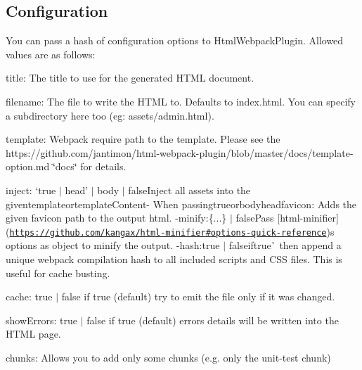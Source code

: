 \subsection*{Configuration }

You can pass a hash of configuration options to {\ttfamily Html\+Webpack\+Plugin}. Allowed values are as follows\+:


\begin{DoxyItemize}
\item {\ttfamily title}\+: The title to use for the generated H\+T\+ML document.
\item {\ttfamily filename}\+: The file to write the H\+T\+ML to. Defaults to {\ttfamily index.\+html}. You can specify a subdirectory here too (eg\+: {\ttfamily assets/admin.\+html}).
\item {\ttfamily template}\+: Webpack require path to the template. Please see the https\+://github.com/jantimon/html-\/webpack-\/plugin/blob/master/docs/template-\/option.\+md \char`\"{}docs\char`\"{} for details.
\item {\ttfamily inject}\+: `true $\vert$ \textquotesingle{}head' $\vert$ \textquotesingle{}body\textquotesingle{} $\vert$ false{\ttfamily Inject all assets into the given}template{\ttfamily or}template\+Content{\ttfamily -\/ When passing}true{\ttfamily or}\textquotesingle{}body\textquotesingle{}headfavicon{\ttfamily \+: Adds the given favicon path to the output html. -\/}minify{\ttfamily \+:}\{...\} $\vert$ false{\ttfamily Pass \mbox{[}html-\/minifier\mbox{]}(\href{https://github.com/kangax/html-minifier#options-quick-reference}{\tt https\+://github.\+com/kangax/html-\/minifier\#options-\/quick-\/reference})\textquotesingle{}s options as object to minify the output. -\/}hash{\ttfamily \+:}true $\vert$ false{\ttfamily if}true\`{} then append a unique webpack compilation hash to all included scripts and C\+SS files. This is useful for cache busting.
\item {\ttfamily cache}\+: {\ttfamily true $\vert$ false} if {\ttfamily true} (default) try to emit the file only if it was changed.
\item {\ttfamily show\+Errors}\+: {\ttfamily true $\vert$ false} if {\ttfamily true} (default) errors details will be written into the H\+T\+ML page.
\item {\ttfamily chunks}\+: Allows you to add only some chunks (e.\+g. only the unit-\/test chunk)

\end{DoxyItemize}
